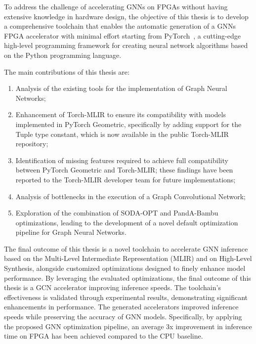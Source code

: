\documentclass[11pt,a4paper,twocolumn]{article}
\begin{document}
To address the challenge of accelerating GNNs on FPGAs without having extensive knowledge in hardware design, the objective of this thesis is to develop a comprehensive toolchain that enables the automatic generation of a GNNs FPGA accelerator with minimal effort
starting from PyTorch~\cite{DBLP:journals/corr/abs-1912-01703}, a cutting-edge high-level programming framework for creating neural network algorithms based on the Python programming language.

The main contributions of this thesis are:
\begin{enumerate}
    \item Analysis of the existing tools for the implementation of Graph Neural Networks;
    \item Enhancement of Torch-MLIR to ensure its compatibility with models implemented in PyTorch Geometric, specifically by adding support for the Tuple type constant, which is now available in the public Torch-MLIR repository;
    \item Identification of missing features required to achieve full compatibility between PyTorch Geometric and Torch-MLIR; these findings have been reported to the Torch-MLIR developer team for future implementations;
    \item Analysis of bottlenecks in the execution of a Graph Convolutional Network;
    \item Exploration of the combination of SODA-OPT and PandA-Bambu optimizations, leading to the development of a novel default optimization pipeline for Graph Neural Networks.
\end{enumerate}

The final outcome of this thesis is a novel toolchain to accelerate GNN inference based on the Multi-Level Intermediate Representation (MLIR) and on High-Level Synthesis, alongside customized optimizations designed to finely enhance model performance.
By leveraging the evaluated optimizations, the final outcome of this thesis is a GCN accelerator improving inference speeds.
The toolchain's effectiveness is validated through experimental results, demonstrating significant enhancements in performance.
The generated accelerators improved inference speeds while preserving the accuracy of GNN models.
Specifically, by applying the proposed GNN optimization pipeline, an average 3x improvement in inference time on FPGA has been achieved compared to the CPU baseline.

\end{document}
